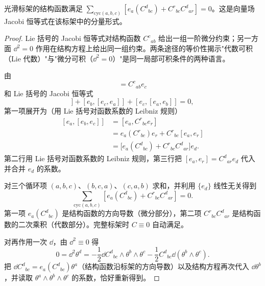 \begin{proposition}
光滑标架的结构函数满足 $\sum_{\mathrm{cyc}(a,b,c)}[e_a(C^d{}_{bc})+C^r{}_{bc}C^d{}_{ar}]=0$。这是向量场 Jacobi 恒等式在该标架中的分量形式。
\end{proposition}
\begin{proof}
Lie 括号的 Jacobi 恒等式对结构函数 $C^c{}_{ab}$ 给出一组一阶微分约束；另一方面 $\dd^2=0$ 作用在结构方程上给出同一组约束。两条途径的等价性揭示"代数可积（Lie 代数）"与"微分可积（$\dd^2=0$）"是同一局部可积条件的两种语言。

由
\begin{equation*}
 [e_a,e_b]=C^c{}_{ab}e_c
\end{equation*}
和 Lie 括号的 Jacobi 恒等式
\begin{equation*}
 [e_a,[e_b,e_c]]+[e_b,[e_c,e_a]]+[e_c,[e_a,e_b]]=0,
\end{equation*}
第一项展开为（用 Lie 括号对函数系数的 Leibniz 规则）
\begin{equation*}
\begin{aligned}
 [e_a,[e_b,e_c]]
 &=[e_a,C^r{}_{bc}e_r]\\
 &=e_a(C^r{}_{bc})e_r+C^r{}_{bc}[e_a,e_r]\\
 &=\bigl[e_a(C^d{}_{bc})+C^r{}_{bc}C^d{}_{ar}\bigr]e_d.
\end{aligned}
\end{equation*}
第二行用 Lie 括号对函数系数的 Leibniz 规则，第三行把 $[e_a,e_r]=C^d{}_{ar}e_d$ 代入并合并 $e_d$ 的系数。

对三个循环项 $(a,b,c)$、$(b,c,a)$、$(c,a,b)$ 求和，并利用 $\{e_d\}$ 线性无关得到
\begin{equation}\label{eq:math-dg-anholonomy-jacobi}
\boxed{
\sum_{\mathrm{cyc}(a,b,c)}
\left[
 e_a(C^d{}_{bc})+C^r{}_{bc}C^d{}_{ar}
\right]=0.}
\end{equation}
第一项 $e_a(C^d{}_{bc})$ 是结构函数的方向导数（微分部分），第二项 $C^r{}_{bc}C^d{}_{ar}$ 是结构函数的二次乘积（代数部分）。完整标架时 $C\equiv0$ 自动满足。

对再作用一次 $\dd$，由 $\dd^2\equiv0$ 得
\begin{equation*}
 0=\dd^2\theta^d
 =-\frac12\dd C^d{}_{bc}\wedge\theta^b\wedge\theta^c
 -\frac12C^d{}_{bc}\dd(\theta^b\wedge\theta^c).
\end{equation*}
把 $\dd C^d{}_{bc}=e_a(C^d{}_{bc})\theta^a$（结构函数沿标架的方向导数）以及结构方程再次代入 $\dd\theta^b$，并读取 $\theta^a\wedge\theta^b\wedge\theta^c$ 的系数，恰好重新得到。


\end{proof}
